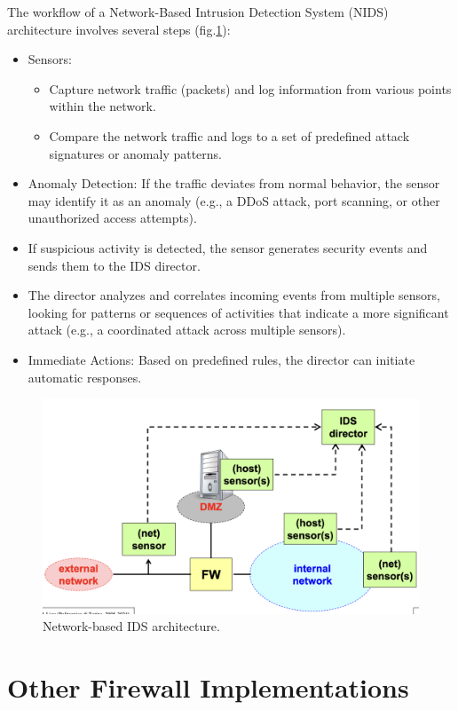 The workflow of a Network-Based Intrusion Detection System (NIDS) architecture involves several steps (fig.\ref{fig:nids_architecture}):
\begin{itemize}
    \item Sensors:
    \begin{itemize}
        \item Capture network traffic (packets) and log information from various points within the network.
        \item Compare the network traffic and logs to a set of predefined attack signatures or anomaly patterns.
    \end{itemize}
    \item Anomaly Detection: If the traffic deviates from normal behavior, the sensor may identify it as an anomaly (e.g., a DDoS attack, port scanning, or other unauthorized access attempts).
    \item If suspicious activity is detected, the sensor generates security events and sends them to the IDS director.
    \item The director analyzes and correlates incoming events from multiple sensors, looking for patterns or sequences of activities that indicate a more significant attack (e.g., a coordinated attack across multiple sensors).
    \item Immediate Actions: Based on predefined rules, the director can initiate automatic responses.
\end{itemize}

\begin{figure}[H]
    \centering
    \includegraphics[width=0.7\linewidth]{Images/Firewalling/nids_architecture.png}
    \caption{Network-based IDS architecture.}
    \label{fig:nids_architecture}
\end{figure}

\section{Other Firewall Implementations}

